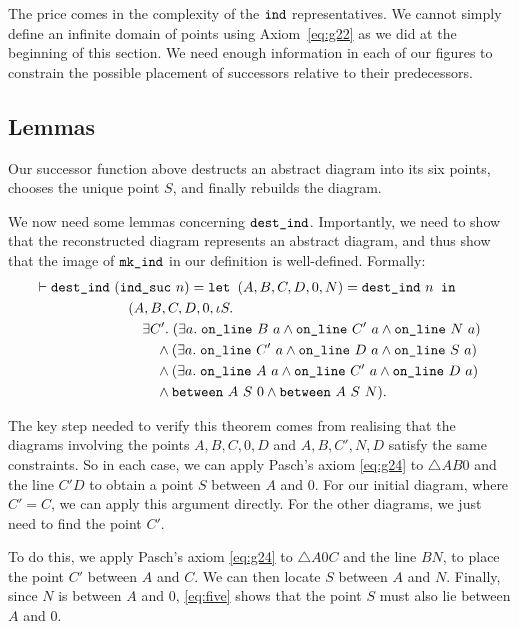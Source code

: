 The price comes in the complexity of the $\texttt{ind}$ representatives. We cannot simply define an infinite domain of points using Axiom~\ref{eq:g22} as we did at the beginning of this section. We need enough information in each of our figures to constrain the possible placement of successors relative to their predecessors.

\subsection{Lemmas}
Our successor function above destructs an abstract diagram into its six points, chooses the unique point $S$, and finally rebuilds the diagram. 

We now need some lemmas concerning $\texttt{dest\_ind}$. Importantly, we need to show that the reconstructed diagram represents an abstract diagram, and thus show that the image of $\texttt{mk\_ind}$ in our definition is well-defined. Formally:
\begin{align*}
\vdash \texttt{dest\_ind}\ &(\texttt{ind\_suc}\ n) =  \texttt{let } (A,B,C,D,0,N) = \texttt{dest\_ind}\ n \texttt{ in}\\
&\quad (A,B,C,D,0,\iota S.\\
&\quad\quad \exists C'.\; (\exists a.\;\texttt{on\_line}\ B\ a \wedge \texttt{on\_line}\ C'\ a \wedge \texttt{on\_line}\ N\ a)\\
&\qquad\quad \wedge (\exists a.\;\texttt{on\_line}\ C'\ a \wedge \texttt{on\_line}\ D\ a \wedge \texttt{on\_line}\ S\ a)\\
&\qquad\quad \wedge (\exists a.\;\texttt{on\_line}\ A\ a \wedge \texttt{on\_line}\ C'\ a \wedge \texttt{on\_line}\ D\ a)\\
&\qquad\quad \wedge \texttt{between}\ A\ S\ 0 \wedge \texttt{between}\ A\ S\ N).
\end{align*} 

The key step needed to verify this theorem comes from realising that the diagrams involving the points $A,B,C,0,D$ and $A,B,C',N,D$ satisfy the same constraints. So in each case, we can apply Pasch's axiom \eqref{eq:g24} to $\triangle AB0$ and the line $C'D$ to obtain a point $S$ between $A$ and $0$. For our initial diagram, where $C' = C$, we can apply this argument directly. For the other diagrams, we just need to find the point $C'$.

To do this, we apply Pasch's axiom \eqref{eq:g24} to $\triangle A0C$ and the line $BN$, to place the point $C'$ between $A$ and $C$. We can then locate $S$ between $A$ and $N$. Finally, since $N$ is between $A$ and $0$, \ref{eq:five} shows that the point $S$ must also lie between $A$ and $0$. 

